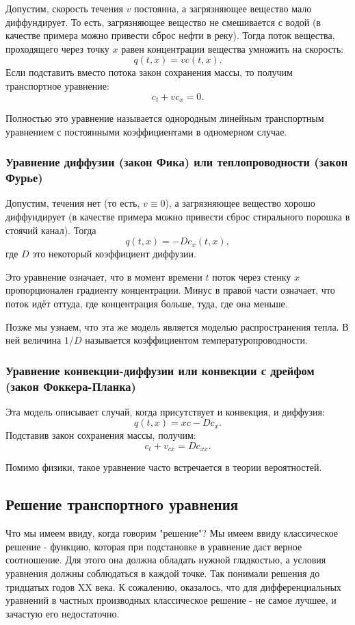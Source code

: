 Допустим, скорость течения $v$ постоянна, а загрязняющее вещество мало диффундирует. То есть, загрязняющее вещество не смешивается с водой (в качестве примера можно привести сброс нефти в реку). Тогда поток вещества, проходящего через точку $x$ равен концентрации вещества умножить на скорость:
$$ q (t, x) = v c (t, x). $$
Если подставить вместо потока закон сохранения массы, то получим транспортное уравнение:
$$ c_t + v c_x = 0.$$

Полностью это уравнение называется однородным линейным транспортным уравнением с постоянными коэффициентами в одномерном случае.

\subsubsection*{Уравнение диффузии (закон Фика) или теплопроводности (закон Фурье)}

Допустим, течения нет (то есть, $ v \equiv 0 $), а загрязняющее вещество хорошо диффундирует (в качестве примера можно привести сброс стирального порошка в стоячий канал). Тогда
$$ q (t, x) = - D c_x (t, x), $$
где $D$ это некоторый коэффициент диффузии.

Это уравнение означает, что в момент времени $t$ поток через стенку $x$ пропорционален градиенту концентрации. Минус в правой части означает, что поток идёт оттуда, где концентрация больше, туда, где она меньше.

Позже мы узнаем, что эта же модель является моделью распространения тепла. В ней величина $1/D$ называется коэффициентом температуропроводности.

\subsubsection*{Уравнение конвекции-диффузии или конвекции с дрейфом (закон Фоккера-Планка)}
Эта модель описывает случай, когда присутствует и конвекция, и диффузия:
$$ q (t, x)  = x c - D c_x. $$
Подставив закон сохранения массы, получим:
$$ c_t + v_{cx} = D c_{xx}. $$

Помимо физики, такое уравнение часто встречается в теории вероятностей.

\subsection{Решение транспортного уравнения}
Что мы имеем ввиду, когда говорим "решение"? Мы имеем ввиду классическое решение - функцию, которая при подстановке в уравнение даст верное соотношение. Для этого она должна обладать нужной гладкостью, а условия уравнения должны соблюдаться в каждой точке. Так понимали решения до тридцатых годов XX века. К сожалению, оказалось, что для дифференциальных уравнений в частных производных классическое решение - не самое лучшее, и зачастую его недостаточно.

